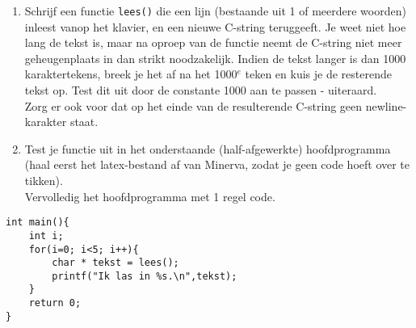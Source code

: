 \beginoef
\begin{enumerate}
\item 
Schrijf een functie \verb}lees()} die een lijn (bestaande uit 1 of meerdere woorden) inleest vanop het klavier, en een nieuwe C-string teruggeeft. 
Je weet niet hoe lang de tekst is, maar na oproep van de functie neemt de C-string niet meer geheugenplaats in dan strikt noodzakelijk. 
Indien de tekst langer is dan 1000 karaktertekens, breek je het af na het 1000$^e$ teken en kuis je de resterende tekst op. Test dit uit door de constante 1000 aan te passen - uiteraard.
\\Zorg er ook voor dat op het einde van de resulterende C-string geen newline-karakter staat.
\item
Test je functie uit in het onderstaande (half-afgewerkte) hoofdprogramma (haal eerst het latex-bestand af van Minerva, zodat je geen code hoeft over te tikken). 
\\Vervolledig het hoofdprogramma met 1 regel code.
\end{enumerate}
\begin{verbatim}
int main(){
    int i;
    for(i=0; i<5; i++){    
        char * tekst = lees();
        printf("Ik las in %s.\n",tekst);
    }	
    return 0;
}
\end{verbatim}

\endoef

